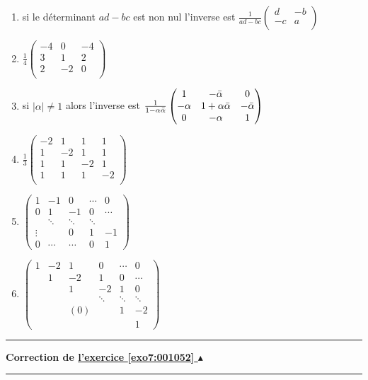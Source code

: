 \documentclass[11pt,a4paper]{article}
\newcounter{exo}
\newcommand{\correction}[1]{\hypertarget{cor7:#1}{}\label{cor7:#1}{\bf Correction de \hyperlink{exo7:#1}{l'exercice \ref{exo7:#1} $\blacktriangle$}}\vspace{1mm}\hrule\vspace{1mm}}
\newcommand{\fincorrection}{\vspace{1mm}\hrule\vspace*{7mm}}
\begin{document}
\begin{enumerate}
  \item  si le déterminant $ad-bc$ est non nul l'inverse est 
$\frac{1}{ad-bc}\begin{pmatrix} d & -b \\ -c & a \\ \end{pmatrix}$
  \item $\frac14 \begin{pmatrix} -4 & 0 & -4 \\ 3 & 1 & 2 \\2 & -2 & 0 \\  \end{pmatrix}$

  \item si $|\alpha|\neq 1$ alors l'inverse est $\frac 1{1-\alpha\bar\alpha}
            \begin{pmatrix} 1       &-\bar\alpha        &0           \cr
                      -\alpha &1+\alpha\bar\alpha &-\bar\alpha \cr
                      0       &-\alpha            &1           \cr\end{pmatrix}$

   \item $\frac13 \begin{pmatrix}
-2 & 1 & 1 & 1 \\ 1 & -2 & 1 & 1 \\ 1 & 1 & -2 & 1 \\ 1 & 1 & 1 & -2 \\
                                      \end{pmatrix}$

  \item $\begin{pmatrix}
1 & -1 & 0 & \cdots & 0 \\
0 & 1 & -1 & 0 & \cdots\\
 & \ddots & \ddots & \ddots &  \\
\vdots & & 0 & 1 & -1  \\
0 & \cdots & \cdots & 0 & 1
\end{pmatrix}$


  \item $\begin{pmatrix}
1 & -2 & 1 & 0 &\cdots & 0 \\
 & 1 & -2 & 1 & 0 & \cdots\\
 &  & 1 & -2 & 1 & 0 \\
 & &  & \ddots & \ddots & \ddots \\
 &  & (0) &  & 1 & -2 \\
 &  &  & &  & 1
\end{pmatrix}$
\end{enumerate}
\fincorrection
\correction{001052}
\end{document}
